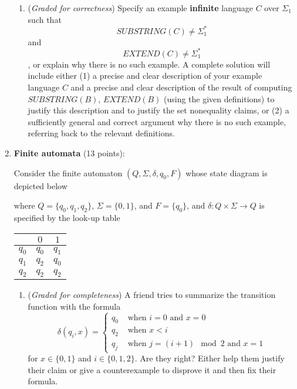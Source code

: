 \documentclass[12pt, oneside]{article}
\newcommand{\gradeCorrect}{({\it Graded for correctness}) }
\newcommand{\gradeComplete}{({\it Graded for completeness}) }
\begin{document}
\begin{enumerate}[wide, labelwidth=!, labelindent=0pt]
\begin{enumerate}
    \item\gradeCorrect Specify an example {\bf infinite} language $C$ over $\Sigma_1$ such that 
    $$SUBSTRING(C) \neq \Sigma_1^*$$ and $$EXTEND(C) \neq \Sigma_1^*$$, or 
    explain why there is no such example.
    A complete solution will include either (1) a precise and
    clear description of your example language $C$ 
    and a precise and clear description of
    the result of computing $SUBSTRING(B)$, $EXTEND(B)$ (using the given definitions)
    to justify this description and to justify the set nonequality claims, 
    or (2) a sufficiently general and correct argument
    why there is no such example, referring back to the relevant definitions.
    \end{enumerate}


\item\textbf{Finite automata} (13 points):

Consider the finite automaton $(Q, \Sigma, \delta, q_0, F)$ whose state diagram is depicted below
\begin{center}
\end{center}
where $Q = \{q_0, q_1, q_2\}$, $\Sigma = \{0,1\}$, and $F = \{q_0\}$, and $\delta: Q \times \Sigma \to Q$
is specified by the look-up table
\begin{center}
\begin{tabular}{c|cc}
        & $0$ & $1$ \\
    \hline
  $q_0$ & $q_0$ & $q_1$ \\
  $q_1$ & $q_2$ & $q_0$ \\
  $q_2$ & $q_2$ & $q_2$
\end{tabular}
\end{center}
    \begin{enumerate}
    \item\gradeComplete A friend tries to summarize the transition function with the formula
    \[
        \delta(q_i,x) = \begin{cases}
            q_0 &\text{ when $i=0$ and $x=0$} \\
            q_2 &\text{ when $x < i$}\\
            q_j &\text{ when $j = (i+1) \mod 2$ and $x=1$}
        \end{cases}
    \]
    for $x \in \{0,1\}$ and $i \in \{0,1,2\}$.
    Are they right? Either help them justify their claim or give a counterexample to disprove it and then 
    fix their formula.


\end{enumerate}
\end{enumerate}
\end{document}
